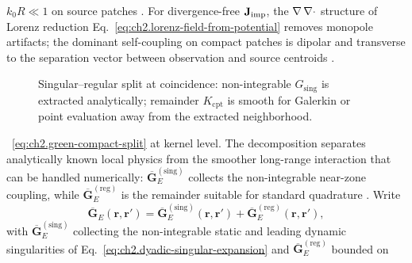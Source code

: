 \(k_0 R\ll 1\) on source patches \cite{harrington2001}. For divergence-free
\(\mathbf{J}_{\mathrm{imp}}\), the \(\nabla\,\nabla\cdot\) structure of Lorenz reduction
Eq.~\eqref{eq:ch2.lorenz-field-from-potential} removes monopole artifacts; the
dominant self-coupling on compact patches is dipolar and transverse to the separation
vector between observation and source centroids \cite{stratton1941}.
\begin{figure}[t]
\centering
{}
\caption{Singular--regular split at coincidence: non-integrable \(G_{\mathrm{sing}}\)
is extracted analytically; remainder \(K_{\mathrm{cpt}}\) is smooth for Galerkin or
point evaluation away from the extracted neighborhood.}
\label{fig:ch2.singular-regularization-split}
\end{figure}
~\eqref{eq:ch2.green-compact-split} at kernel level. The decomposition separates analytically known local physics from the smoother long-range interaction that can be handled numerically: $\overline{\mathbf{G}}_{E}^{\mathrm{(sing)}}$ collects the non-integrable near-zone coupling, while $\overline{\mathbf{G}}_{E}^{\mathrm{(reg)}}$ is the remainder suitable for standard quadrature \cite{harrington2001}. Write
\begin{equation}
\label{eq:ch2.kernel-singular-regular-split}
\overline{\mathbf{G}}_{E}(\mathbf{r},\mathbf{r}')
=
\overline{\mathbf{G}}_{E}^{\mathrm{(sing)}}(\mathbf{r},\mathbf{r}')
+\overline{\mathbf{G}}_{E}^{\mathrm{(reg)}}(\mathbf{r},\mathbf{r}'),
\end{equation} with \(\overline{\mathbf{G}}_{E}^{\mathrm{(sing)}}\) collecting the non-integrable
static and leading dynamic singularities of Eq.~\eqref{eq:ch2.dyadic-singular-expansion}
and \(\overline{\mathbf{G}}_{E}^{\mathrm{(reg)}}\) bounded on
